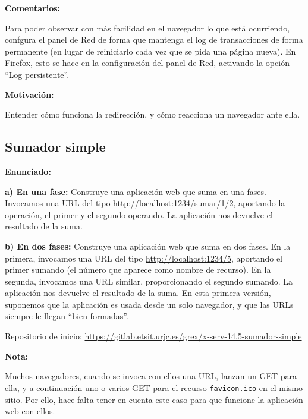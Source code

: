 \textbf{Comentarios:}

Para poder observar con más facilidad en el navegador lo que está ocurriendo, confgura el panel de Red de forma que mantenga el log de transacciones de forma permanente (en lugar de reiniciarlo cada vez que se pida una página nueva). En Firefox, esto se hace en la configuración del panel de Red, activando la opción ``Log persistente''.


\textbf{Motivación:}

Entender cómo funciona la redirección, y cómo reacciona un navegador ante ella.

\subsection{Sumador simple}
\label{subsec:sumador-simple}

\textbf{Enunciado:}

{\bf a) En una fase:} Construye una aplicación web que suma en una fases. Invocamos una URL del tipo \url{http://localhost:1234/sumar/1/2}, aportando la operación, el primer y el segundo operando. La aplicación nos devuelve el resultado de la suma.

{\bf b) En dos fases: } Construye una aplicación web que suma en dos fases. En la primera, invocamos una URL del tipo \url{http://localhost:1234/5}, aportando el primer sumando (el número que aparece como nombre de recurso). En la segunda, invocamos una URL similar, proporcionando el segundo sumando. La aplicación nos devuelve el resultado de la suma. En esta primera versión, suponemos que la aplicación es usada desde un solo navegador, y que las URLs siempre le llegan ``bien formadas''.

Repositorio de inicio: \url{https://gitlab.etsit.urjc.es/grex/x-serv-14.5-sumador-simple}

\textbf{Nota:}

Muchos navegadores, cuando se invoca con ellos una URL, lanzan un GET para ella, y a continuación uno o varios GET para el recurso \texttt{favicon.ico} en el mismo sitio. Por ello, hace falta tener en cuenta este caso para que funcione la aplicación web con ellos.

